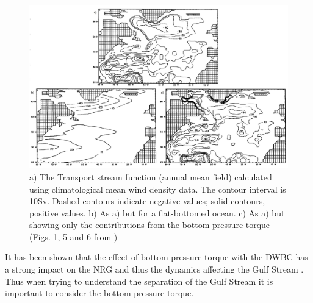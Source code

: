 \documentclass[..\EOYR.tex]{subfiles}
\begin{document}
\begin{figure}[t]
    \includegraphics[width=\linewidth]{Figures/Greatbatch1991Fig1Fig5Fig6.jpg}
    \caption{a) The Transport stream function (annual mean field) calculated using climatological mean wind density data. The contour interval is 10Sv. Dashed contours indicate negative values; solid contours, positive values. b) As a) but for a flat-bottomed ocean. c) As a) but showing only the contributions from the bottom pressure torque (Figs. 1, 5 and 6 from \citep{Greatbatch1991})}
    \label{FIG:Greatbatch1991Fig1Fig5Fig6}
\end{figure}



It has been shown that the effect of bottom pressure torque with the DWBC has a strong impact on the NRG and thus the dynamics affecting the Gulf Stream \citep{Zhang2007}. Thus when trying to understand the separation of the Gulf Stream it is important to consider the bottom pressure torque.





\end{document}

